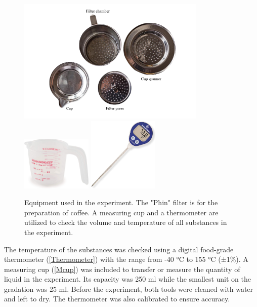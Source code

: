 \documentclass[11pt]{article}
\begin{document}
\begin{figure}[H]
	\centering
		{\includegraphics[width=0.8\textwidth,height=0.35\textheight]{Vfilter}}
		{\includegraphics[width=0.3\textwidth,height=0.2\textheight]{Mcup}}
		{\includegraphics[width=0.3\textwidth,height=0.2\textheight]{Thermometer}}
	\caption{Equipment used in the experiment. The "Phin" filter is for the preparation of coffee. A measuring cup and a thermometer are utilized to check the volume and temperature of all substances in the experiment.}
	\label{Figure 2}
\end{figure}

\pagebreak

The temperature of the substances was checked using a digital food-grade thermometer (\autoref{Thermometer}) with the range from -40 °C to 155 °C (±1$\%$). A measuring cup (\autoref{Mcup}) was included to transfer or measure the quantity of liquid in the experiment. Its capacity was 250 ml while the smallest unit on the gradation was 25 ml. Before the experiment, both tools were cleaned with water and left to dry. The thermometer was also calibrated to ensure accuracy. 
\end{document}
